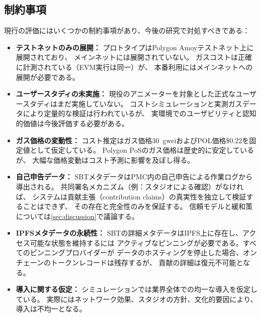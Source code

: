 \subsection{制約事項}
\label{subsec:eval_limitations}

現行の評価にはいくつかの制約事項があり、今後の研究で対処すべきである：

\begin{itemize}
  \item \textbf{テストネットのみの展開：}
    プロトタイプはPolygon Amoyテストネット上に展開されており、
    メインネットには展開されていない。
    ガスコストは正確に計測されている（EVM実行は同一）が、
    本番利用にはメインネットへの展開が必要である。
  \item \textbf{ユーザースタディの未実施：}
    現役のアニメーターを対象とした正式なユーザースタディはまだ実施していない。
    コストシミュレーションと実測ガスデータにより定量的な検証は行われているが、
    実環境でのユーザビリティと認知的価値は今後評価する必要がある。
  \item \textbf{ガス価格の変動性：}
    コスト推定はガス価格30~gweiおよびPOL価格\$0.22を固定値として仮定している。
    Polygon PoSのガス価格は歴史的に安定しているが、
    大幅な価格変動はコスト予測に影響を及ぼし得る。
  \item \textbf{自己申告データ：}
    SBTメタデータはPMC内の自己申告による作業ログから導出される。
    共同署名メカニズム（例：スタジオによる確認）がなければ、
    システムは貢献主張（contribution claims）の真実性を独立して検証することはできず、
    その存在と完全性のみを保証する。
    信頼モデルと緩和策については\cref{sec:discussion}で議論する。
  \item \textbf{IPFSメタデータの永続性：}
    SBTの詳細メタデータはIPFS上に存在し、アクセス可能な状態を維持するには
    アクティブなピンニングが必要である。すべてのピンニングプロバイダーが
    データのホスティングを停止した場合、オンチェーンのトークンレコードは残存するが、
    貢献の詳細は復元不可能となる。
  \item \textbf{導入に関する仮定：}
    シミュレーションでは業界全体での均一な導入を仮定している。
    実際にはネットワーク効果、スタジオの方針、文化的要因により、
    導入は不均一となる。
\end{itemize}

